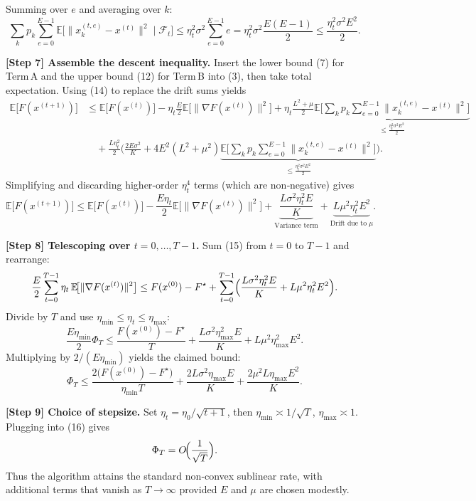 \documentclass{article}
\newcommand{\E}{\mathbb{E}}
\begin{document}
Summing over $e$ and averaging over $k$:
\[
\sum_{k}p_k\sum_{e=0}^{E-1}\E\!\bigl[\|x_{k}^{(t,e)}-x^{(t)}\|^{2}\mid\mathcal{F}_t\bigr]
\le \eta_t^{2}\sigma^{2}\sum_{e=0}^{E-1}e
= \eta_t^{2}\sigma^{2}\frac{E(E-1)}{2}
\le \frac{\eta_t^{2}\sigma^{2}E^{2}}{2}.
\tag{14}
\]

\medskip
\noindent\textbf{[Step 7] Assemble the descent inequality.}  
Insert the lower bound (7) for Term A and the upper bound (12) for Term B
into (3), then take total expectation.
Using (14) to replace the drift sums yields
\begin{align}
\E\!\bigl[F(x^{(t+1)})\bigr]
&\le \E\!\bigl[F(x^{(t)})\bigr]
   -\eta_t\frac{E}{2}\E\!\bigl[\|\nabla F(x^{(t)})\|^{2}\bigr]
   +\eta_t\frac{L^{2}+\mu}{2}\underbrace{
          \E\!\bigl[\sum_{k}p_k\sum_{e=0}^{E-1}\|x_{k}^{(t,e)}-x^{(t)}\|^{2}\bigr]}_{\le \frac{\eta_t^{2}\sigma^{2}E^{2}}{2}}
   \nonumber\\
&\quad +\frac{L\eta_t^{2}}{2}
   \biggl(
        \frac{2E\sigma^{2}}{K}
        +4E^{2}(L^{2}+\mu^{2})\underbrace{
          \E\!\bigl[\sum_{k}p_k\sum_{e=0}^{E-1}\|x_{k}^{(t,e)}-x^{(t)}\|^{2}\bigr]}_{\le \frac{\eta_t^{2}\sigma^{2}E^{2}}{2}}
   \biggr) .
\end{align}
Simplifying and discarding higher‑order $\eta_t^{4}$ terms (which are
non‑negative) gives
\begin{equation}
\E\!\bigl[F(x^{(t+1)})\bigr]
\le \E\!\bigl[F(x^{(t)})\bigr]
   -\frac{E\eta_t}{2}\E\!\bigl[\|\nabla F(x^{(t)})\|^{2}\bigr]
   +\underbrace{\frac{L\sigma^{2}\eta_t^{2}E}{K}}_{\text{Variance term}}
   +\underbrace{L\mu^{2}\eta_t^{2}E^{2}}_{\text{Drift due to $\mu$}} .
\tag{15}
\end{equation}

\medskip
\noindent\textbf{[Step 8] Telescoping over $t=0,\dots,T-1$.}  
Sum (15) from $t=0$ to $T-1$ and rearrange:
\[
\frac{E}{2}\sum_{t=0}^{T-1}\eta_t\,\E\!\bigl[\|\nabla F(x^{(t)})\|^{2}\bigr]
\le F(x^{(0)})-F^\star
   +\sum_{t=0}^{T-1}\Bigl(
        \frac{L\sigma^{2}\eta_t^{2}E}{K}
        +L\mu^{2}\eta_t^{2}E^{2}
      \Bigr).
\]
Divide by $T$ and use $\eta_{\min}\le\eta_t\le\eta_{\max}$:
\[
\frac{E\eta_{\min}}{2}\Phi_T
\le \frac{F(x^{(0)})-F^\star}{T}
   +\frac{L\sigma^{2}\eta_{\max}^{2}E}{K}
   +L\mu^{2}\eta_{\max}^{2}E^{2}.
\]
Multiplying by $2/(E\eta_{\min})$ yields the claimed bound:
\[
\Phi_T\le
\frac{2\bigl(F(x^{(0)})-F^\star\bigr)}{\eta_{\min}T}
+\frac{2L\sigma^{2}\eta_{\max}E}{K}
+\frac{2\mu^{2}L\eta_{\max}E^{2}}{K}.
\tag{16}
\]

\medskip
\noindent\textbf{[Step 9] Choice of stepsize.}  
Set $\eta_t=\eta_0/\sqrt{t+1}$, then $\eta_{\min}\asymp 1/\sqrt{T}$,
$\eta_{\max}\asymp 1$. Plugging into (16) gives
\[
\Phi_T = O\!\Bigl(\frac{1}{\sqrt{T}}\Bigr) .
\]
Thus the algorithm attains the standard non‑convex sublinear rate,
with additional terms that vanish as $T\to\infty$ provided $E$ and $\mu$ are
chosen modestly.
\end{document}

